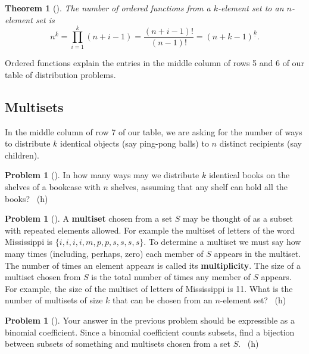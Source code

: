 \documentclass[10pt,]{book}
\newcommand{\terminology}[1]{\textbf{#1}}
\theoremstyle{plain}
\newtheorem{theorem}{Theorem}[section]
\theoremstyle{definition}
\newtheorem{activity}[project]{Problem}
\theoremstyle{definition}
\numberwithin{equation}{chapter}
\newcommand{\importantarrow}{\Rightarrow}
\begin{document}
\begin{theorem}[{}]\label{theorem-6}
\hypertarget{p-754}{}%
The number of ordered functions from a \(k\)-element set to an \(n\)-element set is%
\begin{equation*}
n^{\overline{k}}=\prod_{i=1}^k (n+i-1) = \frac{(n+i-1)!}{(n-1)!} =
(n+k-1)^{\underline{k}}.
\end{equation*}
%
\end{theorem}
\hypertarget{p-755}{}%
Ordered functions explain the entries in the middle column of rows 5 and 6 of our table of distribution problems.%
\typeout{************************************************}
\typeout{************************************************}
\subsection[{Multisets}]{Multisets}\label{subsection-30}
\hypertarget{p-756}{}%
In the middle column of row 7 of our table, we are asking for the number of ways to distribute \(k\) identical objects (say ping-pong balls) to \(n\) distinct recipients (say children).%
\begin{activity}[] \label{identicalbooks}
\hypertarget{p-757}{}%
In how many ways may we distribute \(k\) identical books on the shelves of a bookcase with \(n\) shelves, assuming that any shelf can hold all the books?%
~{\tiny (h)}\end{activity}
\begin{activity}[] \label{multiset}
\hypertarget{p-760}{}%
A \terminology{multiset} chosen from a set \(S\) may be thought of as a subset with repeated elements allowed. For example the multiset of letters of the word Mississippi is \(\{i,i,i,i,m,p,p,s,s,s,s\}\). To determine a multiset we must say how many times (including, perhaps, zero) each member of \(S\) appears in the multiset. The number of times an element appears is called its \terminology{multiplicity}. The size of a multiset chosen from \(S\) is the total number of times any member of \(S\) appears. For example, the size of the multiset of letters of Mississippi is 11. What is the number of multisets of size \(k\) that can be chosen from an \(n\)-element set?%
~{\tiny (h)}\end{activity}
\begin{activity}[]\marginsymbol[-1em]{\pdftooltip{$\importantarrow$}{especially interesting}} \label{activity-126}
\hypertarget{p-763}{}%
Your answer in the previous problem should be expressible as a binomial coefficient. Since a binomial coefficient counts subsets, find a bijection between subsets of something and multisets chosen from a set \(S\).%
~{\tiny (h)}\end{activity}
\end{document}
